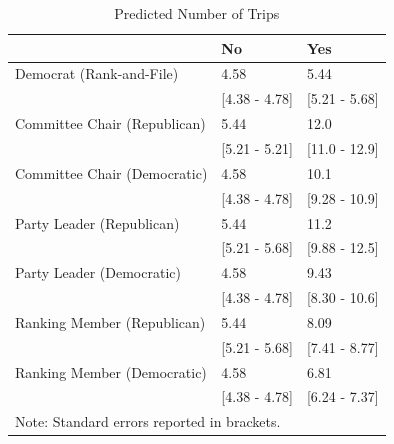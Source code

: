 \documentclass[12pt]{article}                           %
\begin{document}
\begin{table}[h]
\centering
\caption{Predicted Number of Trips}
\label{}
\begin{tabular}{@{}lll@{}}
\toprule
                            & No                 & Yes                 \\ \midrule
Democrat (Rank-and-File)    & 4.58              & 5.44              \\
                            & {[}4.38 - 4.78{]} & {[}5.21 - 5.68{]} \\
Committee Chair (Republican)& 5.44              & 12.0              \\
                            & {[}5.21 - 5.21{]} & {[}11.0 - 12.9{]} \\
Committee Chair (Democratic)& 4.58              & 10.1              \\
                            & {[}4.38 - 4.78{]} & {[}9.28 - 10.9{]} \\
Party Leader (Republican)   & 5.44              & 11.2              \\
                            & {[}5.21 - 5.68{]} & {[}9.88 - 12.5{]} \\
Party Leader (Democratic)   & 4.58              & 9.43              \\
                            & {[}4.38 - 4.78{]} & {[}8.30 - 10.6{]} \\
Ranking Member (Republican) & 5.44              & 8.09              \\
                            & {[}5.21 - 5.68{]} & {[}7.41 - 8.77{]} \\
Ranking Member (Democratic) & 4.58              & 6.81              \\
                            & {[}4.38 - 4.78{]} & {[}6.24 - 7.37{]} \\ \bottomrule
\multicolumn{2}{l}{\footnotesize Note: Standard errors reported in brackets.}    \\
\end{tabular}
\end{table}

\newpage
\clearpage
\end{document}
